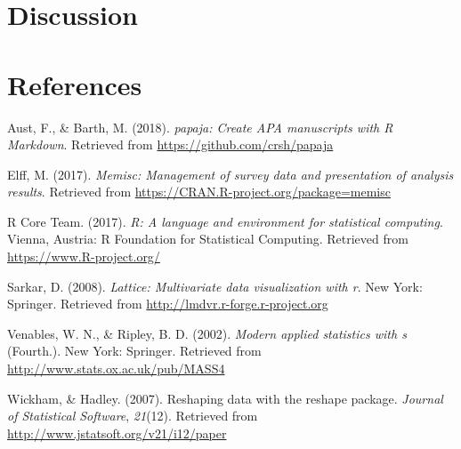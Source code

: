\documentclass[english,man]{apa6}
\theoremstyle{definition}
\theoremstyle{definition}
\theoremstyle{definition}
\theoremstyle{remark}
\begin{document}
\section{Discussion}\label{discussion}

\newpage

\section{References}\label{references}

\setlength{\parindent}{-0.5in} \setlength{\leftskip}{0.5in}

\hypertarget{refs}{}
\hypertarget{ref-R-papaja}{}
Aust, F., \& Barth, M. (2018). \emph{papaja: Create APA manuscripts with
R Markdown}. Retrieved from \url{https://github.com/crsh/papaja}

\hypertarget{ref-R-memisc}{}
Elff, M. (2017). \emph{Memisc: Management of survey data and
presentation of analysis results}. Retrieved from
\url{https://CRAN.R-project.org/package=memisc}

\hypertarget{ref-R-base}{}
R Core Team. (2017). \emph{R: A language and environment for statistical
computing}. Vienna, Austria: R Foundation for Statistical Computing.
Retrieved from \url{https://www.R-project.org/}

\hypertarget{ref-R-lattice}{}
Sarkar, D. (2008). \emph{Lattice: Multivariate data visualization with
r}. New York: Springer. Retrieved from
\url{http://lmdvr.r-forge.r-project.org}

\hypertarget{ref-R-MASS}{}
Venables, W. N., \& Ripley, B. D. (2002). \emph{Modern applied
statistics with s} (Fourth.). New York: Springer. Retrieved from
\url{http://www.stats.ox.ac.uk/pub/MASS4}

\hypertarget{ref-R-reshape}{}
Wickham, \& Hadley. (2007). Reshaping data with the reshape package.
\emph{Journal of Statistical Software}, \emph{21}(12). Retrieved from
\url{http://www.jstatsoft.org/v21/i12/paper}
\end{document}

